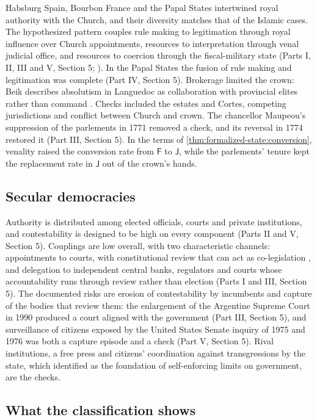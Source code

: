\documentclass[11pt,letterpaper]{article}
\theoremstyle{definition}
\theoremstyle{remark}
\newcommand{\pF}{\mathsf{F}}
\newcommand{\pJ}{\mathsf{J}}
\begin{document}
Habsburg Spain, Bourbon France and the Papal States intertwined royal authority with the Church, and their diversity matches that of the Islamic cases. The hypothesized pattern couples rule making to legitimation through royal influence over Church appointments, resources to interpretation through venal judicial office, and resources to coercion through the fiscal-military state (Parts I, II, III and V, Section 5; \citealt{tilly1990,ertman1997}). In the Papal States the fusion of rule making and legitimation was complete (Part IV, Section 5). Brokerage limited the crown: Beik describes absolutism in Languedoc as collaboration with provincial elites rather than command \citep{beik1985}. Checks included the estates and Cortes, competing jurisdictions and conflict between Church and crown. The chancellor Maupeou's suppression of the parlements in 1771 removed a check, and its reversal in 1774 restored it (Part III, Section 5). In the terms of \cref{thm:formalized-state:conversion}, venality raised the conversion rate from $\pF$ to $\pJ$, while the parlements' tenure kept the replacement rate in $\pJ$ out of the crown's hands.

\subsection{Secular democracies}

Authority is distributed among elected officials, courts and private institutions, and contestability is designed to be high on every component (Parts II and V, Section 5). Couplings are low overall, with two characteristic channels: appointments to courts, with constitutional review that can act as co-legislation \citep{hirschl2004}, and delegation to independent central banks, regulators and courts whose accountability runs through review rather than election (Parts I and III, Section 5). The documented risks are erosion of contestability by incumbents and capture of the bodies that review them: the enlargement of the Argentine Supreme Court in 1990 produced a court aligned with the government (Part III, Section 5), and surveillance of citizens exposed by the United States Senate inquiry of 1975 and 1976 was both a capture episode and a check (Part V, Section 5). Rival institutions, a free press and citizens' coordination against transgressions by the state, which \citet{weingast1997} identified as the foundation of self-enforcing limits on government, are the checks.

\subsection{What the classification shows}
\end{document}
